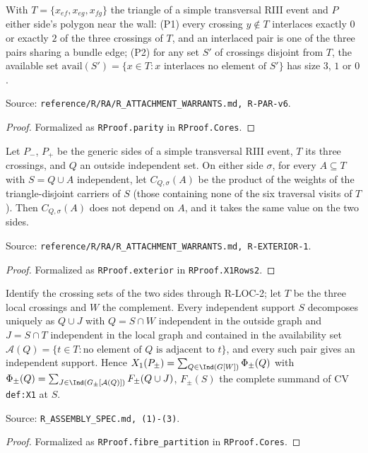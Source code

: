 \begin{obligation}\label{R:parity}\leanok
With $T=\{x_{ef},x_{eg},x_{fg}\}$ the triangle of a simple transversal RIII event and $P$ either side's polygon near the
wall: (P1) every crossing $y\notin T$ interlaces exactly $0$ or exactly $2$ of the three crossings of $T$, and an interlaced
pair is one of the three pairs sharing a bundle edge; (P2) for any set $S'$ of crossings disjoint from $T$, the available set
$\mathrm{avail}(S')=\{x\in T: x\text{ interlaces no element of }S'\}$ has size $3$, $1$ or $0$.

Source: \texttt{reference/R/RA/R\_ATTACHMENT\_WARRANTS.md, R-PAR-v6}.
\end{obligation}
\begin{proof}\leanok{}
Formalized as \texttt{RProof.parity} in \texttt{RProof.Cores}.
\end{proof}

\begin{obligation}\label{R:exterior}\leanok
Let $P_-$, $P_+$ be the generic sides of a simple transversal RIII event, $T$ its three crossings, and $Q$ an outside
independent set. On either side $\sigma$, for every $A\subseteq T$ with $S=Q\cup A$ independent, let $C_{Q,\sigma}(A)$ be the
product of the weights of the triangle-disjoint carriers of $S$ (those containing none of the six traversal visits of $T$).
Then $C_{Q,\sigma}(A)$ does not depend on $A$, and it takes the same value on the two sides.

Source: \texttt{reference/R/RA/R\_ATTACHMENT\_WARRANTS.md, R-EXTERIOR-1}.
\end{obligation}
\begin{proof}\leanok{}
Formalized as \texttt{RProof.exterior} in \texttt{RProof.X1Rows2}.
\end{proof}

\begin{obligation}\label{R:fibre_partition}\leanok
Identify the crossing sets of the two sides through R-LOC-2; let $T$ be the three local crossings and $W$ the
complement. Every independent support $S$ decomposes uniquely as $Q\cup J$ with $Q=S\cap W$ independent in the outside
graph and $J=S\cap T$ independent in the local graph and contained in the availability set
$\mathcal A(Q)=\{t\in T:\text{no element of }Q\text{ is adjacent to }t\}$, and every such pair gives an independent support.
Hence $X_1(P_\pm)=\sum_{Q\in\Ind(G[W])}\Phi_\pm(Q)$ with $\Phi_\pm(Q)=\sum_{J\in\Ind(G_\pm[\mathcal A(Q)])}F_\pm(Q\cup J)$,
$F_\pm(S)$ the complete summand of CV \texttt{def:X1} at $S$.

Source: \texttt{R\_ASSEMBLY\_SPEC.md, (1)-(3)}.
\end{obligation}
\begin{proof}\leanok{}
Formalized as \texttt{RProof.fibre\_partition} in \texttt{RProof.Cores}.
\end{proof}

